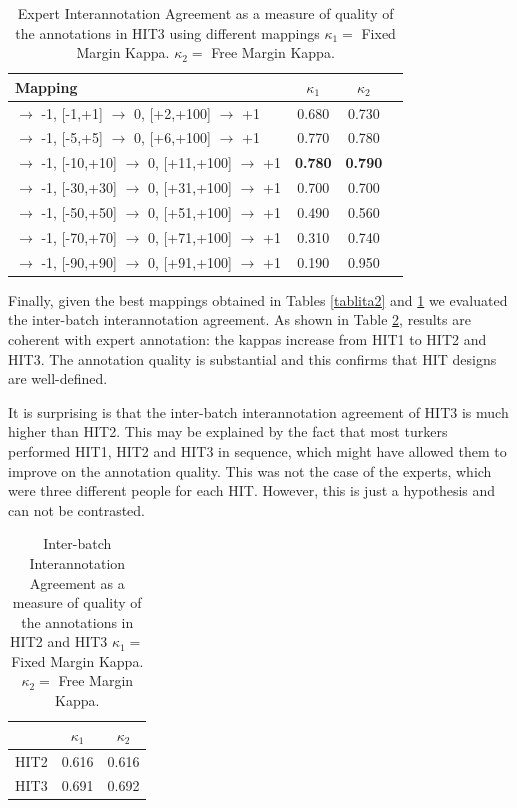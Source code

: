 \documentclass[11pt, a4paper,onecolumn]{article}
\begin{document}
\begin{table}[h]
\begin{center}
\begin{tabular}{|l|c|c|c|}
\hline
Mapping & $\kappa_{1}$ & $\kappa_{2}$ \\ 
\hline
 [-100,-2] $\rightarrow$ -1, [-1,+1] $\rightarrow$ 0, [+2,+100] $\rightarrow$ +1& 0.680 & 0.730\\ \hline
 [-100,-6] $\rightarrow$ -1, [-5,+5] $\rightarrow$ 0, [+6,+100] $\rightarrow$ +1& 0.770 & 0.780\\ \hline
 [-100,-11] $\rightarrow$ -1, [-10,+10] $\rightarrow$ 0, [+11,+100] $\rightarrow$ +1& \textbf{0.780} & \textbf{0.790}\\ \hline
 [-100,-31] $\rightarrow$ -1, [-30,+30] $\rightarrow$ 0, [+31,+100] $\rightarrow$ +1& 0.700 & 0.700\\ \hline
 [-100,-51] $\rightarrow$ -1, [-50,+50] $\rightarrow$ 0, [+51,+100] $\rightarrow$ +1& 0.490 & 0.560\\ \hline
 [-100,-71] $\rightarrow$ -1, [-70,+70] $\rightarrow$ 0, [+71,+100] $\rightarrow$ +1& 0.310 & 0.740\\ \hline
[-100,-91] $\rightarrow$ -1, [-90,+90] $\rightarrow$ 0, [+91,+100] $\rightarrow$ +1& 0.190 & 0.950\\ \hline
\end{tabular}
\end{center}
\caption{Expert Interannotation Agreement as a measure of quality of the annotations in HIT3 using different mappings $\kappa_{1} = $ Fixed Margin Kappa. $\kappa_{2} = $ Free Margin Kappa.}
\label{tablita3}
\end{table}


Finally, given the best mappings obtained in Tables \ref{tablita2} and \ref{tablita3} we evaluated the inter-batch interannotation agreement. As shown in Table  \ref{tablita4}, results are coherent with expert annotation: the kappas increase from HIT1 to HIT2 and HIT3. The annotation quality is substantial and this confirms that HIT designs are well-defined. 

It is surprising is that the inter-batch interannotation agreement 
of HIT3 is much higher than HIT2. This may be explained by the fact that most turkers performed HIT1, HIT2 and HIT3 in sequence, which might have allowed them to improve on the annotation quality. This was not the case of the experts, which were three different people for each HIT. However, this is just a hypothesis and can not be contrasted. 

\begin{table}[h]
\begin{center}
\begin{tabular}{|l|c|c|}
\hline
 & $\kappa_{1}$ & $\kappa_{2}$ \\ 
\hline
HIT2&   0.616 & 0.616\\ \hline
HIT3&   0.691 & 0.692\\ \hline
\end{tabular}
\end{center}
\caption{Inter-batch Interannotation Agreement as a measure of quality of the annotations in HIT2 and HIT3 $\kappa_{1} = $ Fixed Margin Kappa. $\kappa_{2} = $ Free Margin Kappa.}
\label{tablita4}
\end{table}
\end{document}
